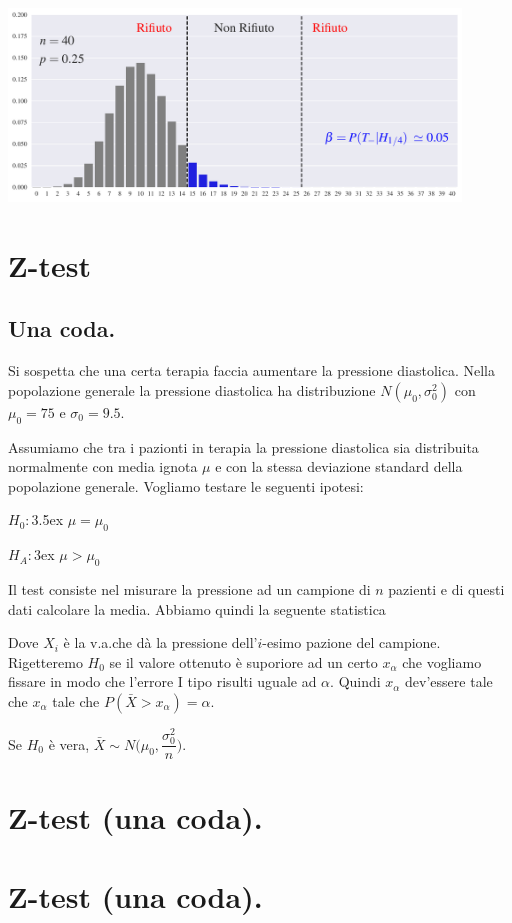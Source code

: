 \documentclass[10pt,openany]{book}
\theoremstyle{mio}
\theoremstyle{liscio}
\begin{document}
\hfil\includegraphics[width=0.9\textwidth]{figure/B-test_09.pdf}



\clearpage
\section{Z-test}
\subsection{Una coda.}

Si sospetta che una certa terapia faccia aumentare la pressione diastolica. Nella popolazione generale la pressione diastolica ha distribuzione $N(\mu_0,\sigma_0^2)$ con $\mu_0=75$ e $\sigma_0=9.5$. 

Assumiamo che tra i pazionti in terapia la pressione diastolica sia distribuita normalmente con media ignota $\mu$ e con la stessa deviazione standard della popolazione generale. Vogliamo testare le seguenti ipotesi:

$H_0:$\kern3.5ex $\mu=\mu_0$

$H_A:$\kern3ex $\mu>\mu_0$

Il test consiste nel misurare la pressione ad un campione di $n$ pazienti e di questi dati calcolare la media. Abbiamo quindi la seguente statistica


Dove $X_i$ è la v.a.\@ che dà la pressione dell'$i$-esimo pazione del campione. Rigetteremo $H_0$ se il valore ottenuto è suporiore ad un certo $x_\alpha$ che vogliamo fissare in modo che l'errore I tipo risulti uguale ad $\alpha$. Quindi $x_\alpha$ dev'essere tale che $x_\alpha$ tale che $P(\bar X>x_\alpha)=\alpha$.

Se $H_0$ è vera, $\bar X\sim N\bigg(\mu_0,\dfrac{\sigma_0^2}{n}\bigg)$. 

% 



\clearpage\section{Z-test (una coda).}








\clearpage\section{Z-test (una coda).}
\end{document}
